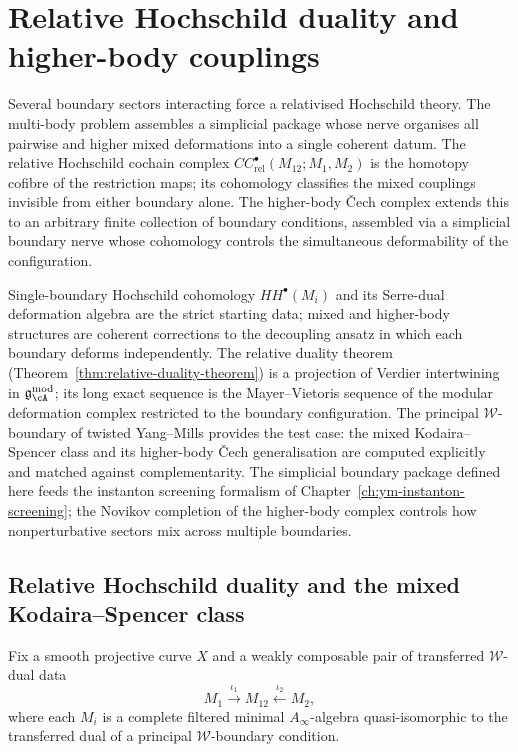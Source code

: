 \chapter{Relative Hochschild duality and higher-body couplings}
\label{ch:ym-higher-body-couplings}


Several boundary sectors interacting force a relativised Hochschild theory.
The multi-body problem assembles a simplicial package whose nerve
organises all pairwise and higher mixed deformations into a single
coherent datum. The relative Hochschild cochain complex
$CC^\bullet_{\mathrm{rel}}(M_{12};M_1,M_2)$ is the homotopy cofibre
of the restriction maps; its cohomology classifies the mixed couplings
invisible from either boundary alone. The higher-body \v{C}ech complex
extends this to an arbitrary finite collection of boundary conditions,
assembled via a simplicial boundary nerve whose cohomology controls
the simultaneous deformability of the configuration.

Single-boundary Hochschild cohomology $HH^\bullet(M_i)$ and its
Serre-dual deformation algebra are the strict starting data; mixed and
higher-body structures are coherent corrections to the decoupling
ansatz in which each boundary deforms independently. The relative duality theorem
(Theorem~\ref{thm:relative-duality-theorem}) is a projection of Verdier
intertwining in $\mathfrak{g}^{\mathrm{mod}}_\cA$; its long exact
sequence is the Mayer--Vietoris sequence of the modular
deformation complex restricted to the boundary configuration. The
principal $\mathcal{W}$-boundary of twisted Yang--Mills provides the
test case: the mixed Kodaira--Spencer class and its higher-body
\v{C}ech generalisation are computed explicitly and matched against
complementarity. The simplicial boundary package defined here feeds
the instanton screening formalism of
Chapter~\ref{ch:ym-instanton-screening}; the Novikov completion of the
higher-body complex controls how nonperturbative sectors mix across
multiple boundaries.

\section{Relative Hochschild duality and the mixed Kodaira--Spencer class}
\label{sec:relative-hochschild-mixed-ks}

Fix a smooth projective curve $X$ and a weakly composable pair of transferred $\mathcal{W}$-dual data
\[
M_1 \xrightarrow{\iota_1} M_{12} \xleftarrow{\iota_2} M_2,
\]
where each $M_i$ is a complete filtered minimal $A_\infty$-algebra quasi-isomorphic to the transferred dual of a principal $\mathcal{W}$-boundary condition.


